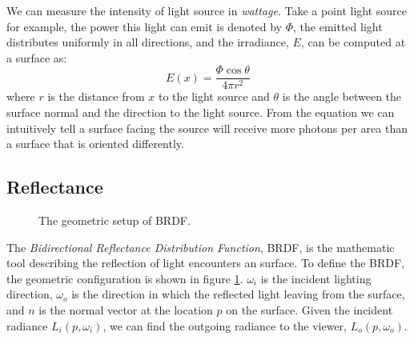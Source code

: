 We can measure the intensity of light source in \emph{wattage}. Take a point light source for example, the power this light can emit is denoted by \(\Phi\), the emitted light distributes uniformly in all directions, and the irradiance, \(E\), can be computed at a surface as:
\begin{equation}
E(x) = \frac{\Phi \cos{\theta}}{4\pi r^{2}}
\end{equation}
where \(r\) is the distance from \(x\) to the light source and \(\theta\) is the angle between the surface normal and the direction to the light source. From the equation we can intuitively tell a surface facing the source will receive more photons per area than a surface that is oriented differently.

\subsection{Reflectance}
\begin{figure}[htp]
    \centering
    \renewcommand{\thefigure}{\thechapter.\arabic{figure}}
    \caption[Geometric setup of BRDF]{The geometric setup of BRDF. }
    \label{fig:brdf}
\end{figure}

The \emph{Bidirectional Reflectance Distribution Function}, BRDF, is the mathematic tool describing the reflection of light encounters an surface. To define the BRDF, the geometric configuration is shown in figure \ref{fig:brdf}. \(\omega_{i}\) is the incident lighting direction, \(\omega_{o}\) is the direction in which the reflected light leaving from the surface, and \(n\) is the normal vector at the location \(p\) on the surface. Given the incident radiance \(L_{i}(p, \omega_{i})\), we can find the outgoing radiance to the viewer, \(L_{o}(p, \omega_{o})\).


